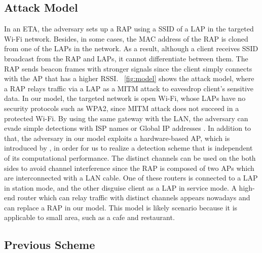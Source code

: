 \documentclass[conference]{IEEEtran}
\begin{document}
\subsection{Attack Model}
In an ETA, the adversary sets up a RAP using a SSID of a LAP in the targeted Wi-Fi network.
Besides, in some cases, the MAC address of the RAP is cloned from one of the LAPs in the network\cite{spoof-evi}.
As a result, although a client receives SSID broadcast from the RAP and LAPs, it cannot differentiate between them.
The RAP sends beacon frames with stronger signals since the client simply connects with the AP that has a higher RSSI.
\figurename~\ref{fig:model} shows the attack model, where a RAP relays traffic via a LAP as a MITM attack to eavesdrop client's sensitive data.
In our model, the targeted network is open Wi-Fi, whose LAPs have no security protocols such as WPA2, since MITM attack does not succeed in a protected Wi-Fi\cite{kataoka}.
By using the same gateway with the LAN, the adversary can evade simple detections with ISP names or Global IP addresses \cite{rtt}.
In addition to that, the adversary in our model exploits a hardware-based AP, which is introduced by \cite{previous}, in order for us to realize a detection scheme that is independent of its computational performance.
The distinct channels can be used on the both sides to avoid channel interference since the RAP is composed of two APs which are interconnected with a LAN cable.
One of these routers is connected to a LAP in station mode, and the other disguise client as a LAP in service mode.
A high-end router which can relay traffic with distinct channels appears nowadays and can replace a RAP in our model.
This model is likely scenario because it is applicable to small area, such as a cafe and restaurant.

\subsection{Previous Scheme}
\end{document}
